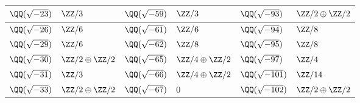 \begin{center}
\begin{tabular}{x{2cm}x{2.5cm}x{2cm}x{2.5cm}x{2cm}x{2.5cm}}
$\QQ (\sqrt{-23})$ & $\ZZ/3$ & $\QQ (\sqrt{-59})$ & $\ZZ/3$ & $\QQ (\sqrt{-93})$ & $\ZZ/2\oplus\ZZ/2$ \tabularnewline\hline
$\QQ (\sqrt{-26})$ & $\ZZ/6$ & $\QQ (\sqrt{-61})$ & $\ZZ/6$ & $\QQ (\sqrt{-94})$ & $\ZZ/8$ \tabularnewline\hline
$\QQ (\sqrt{-29})$ & $\ZZ/6$ & $\QQ (\sqrt{-62})$ & $\ZZ/8$ & $\QQ (\sqrt{-95})$ & $\ZZ/8$ \tabularnewline\hline
$\QQ (\sqrt{-30})$ & $\ZZ/2\oplus\ZZ/2$ & $\QQ (\sqrt{-65})$ & $\ZZ/4\oplus\ZZ/2$ & $\QQ (\sqrt{-97})$ & $\ZZ/4$ \tabularnewline\hline
$\QQ (\sqrt{-31})$ & $\ZZ/3$ & $\QQ (\sqrt{-66})$ & $\ZZ/4\oplus\ZZ/2$ & $\QQ (\sqrt{-101})$ & $\ZZ/14$ \tabularnewline\hline
$\QQ (\sqrt{-33})$ & $\ZZ/2\oplus\ZZ/2$ & $\QQ (\sqrt{-67})$ & $0$ & $\QQ (\sqrt{-102})$ & $\ZZ/2\oplus\ZZ/2$ \tabularnewline\hline
\end{tabular}
\end{center}

\pagebreak


